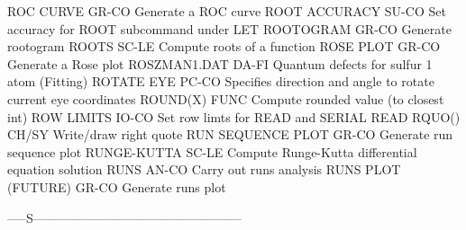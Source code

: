 ROC CURVE                   GR-CO Generate a ROC curve
ROOT ACCURACY               SU-CO Set accuracy for ROOT subcommand under LET
ROOTOGRAM                   GR-CO Generate rootogram
ROOTS                       SC-LE Compute roots of a function
ROSE PLOT                   GR-CO Generate a Rose plot
ROSZMAN1.DAT                DA-FI Quantum defects for sulfur 1 atom (Fitting)
ROTATE EYE                  PC-CO Specifies direction and angle to rotate current eye coordinates
ROUND(X)                    FUNC  Compute rounded value (to closest int)
ROW LIMITS                  IO-CO Set row limts for READ and SERIAL READ
RQUO()                      CH/SY Write/draw right quote
RUN SEQUENCE PLOT           GR-CO Generate run sequence plot
RUNGE-KUTTA                 SC-LE Compute Runge-Kutta differential equation solution
RUNS                        AN-CO Carry out runs analysis
RUNS PLOT (FUTURE)          GR-CO Generate runs plot

-----S--------------------------------------------------

